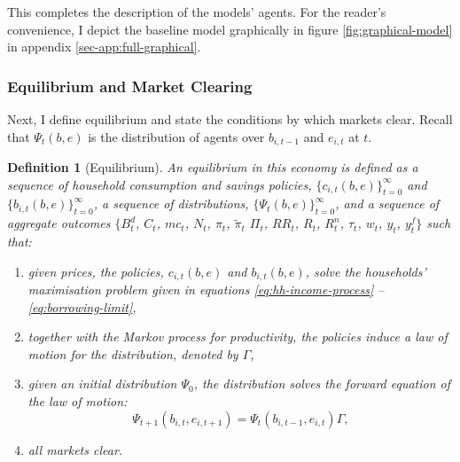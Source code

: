 \documentclass[a4paper,12pt]{article} %
\numberwithin{equation}{section} %
\numberwithin{figure}{section}
\numberwithin{table}{section}
\newtheorem{definition}{Definition}
\begin{document}
This completes the description of the models' agents. For the reader's convenience, I depict the baseline model graphically in figure \ref{fig:graphical-model} in appendix \ref{sec-app:full-graphical}.

\subsubsection{Equilibrium and Market Clearing}
\label{sec:model-eq}

Next, I define equilibrium and state the conditions by which markets clear. Recall that $\Psi_t (b,e)$ is the distribution of agents over $b_{i,t-1}$ and $e_{i,t}$ at $t$.

\begin{definition}[Equilibrium]
\label{def:eq}
An equilibrium in this economy is defined as a sequence of household consumption and savings policies, $\{ c_{i,t} (b, e) \}_{t=0}^{\infty}$ and $\{ b_{i,t} (b, e) \}_{t=0}^{\infty}$, a sequence of distributions, $\{ \Psi_t (b,e) \}_{t=0}^{\infty} $, and a sequence of aggregate outcomes $\{ B_t^d$, $C_t$, $mc_t$, $N_t$, $\pi_t$, $\tilde{\pi}_t$ $\Pi_t$, $RR_t$, $R_t$, $R_t^n$, $\tau_t$, $w_t$, $y_t$, $y_t^f \}$ such that:
\begin{enumerate}
    \item given prices, the policies, $c_{i,t} (b, e)$ and $b_{i,t} (b, e)$, solve the households' maximisation problem given in equations \eqref{eq:hh-income-process} -- \eqref{eq:borrowing-limit},
    \item together with the Markov process for productivity, the policies induce a law of motion for the distribution, denoted by $\Gamma$,
    \item given an initial distribution $\Psi_0$, the distribution solves the forward equation of the law of motion:
    \begin{equation*}
        \Psi_{t+1} (b_{i,t},e_{i,t+1}) = \Psi_{t} (b_{i,t-1},e_{i,t}) \Gamma,
    \end{equation*}
    \item all markets clear.
\end{enumerate}
\end{definition}

\end{document}
